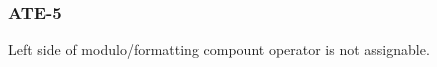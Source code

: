 \subsubsection{ATE-5}\label{sec:error_code_ate_5}

Left side of modulo/formatting compount operator is not assignable.


